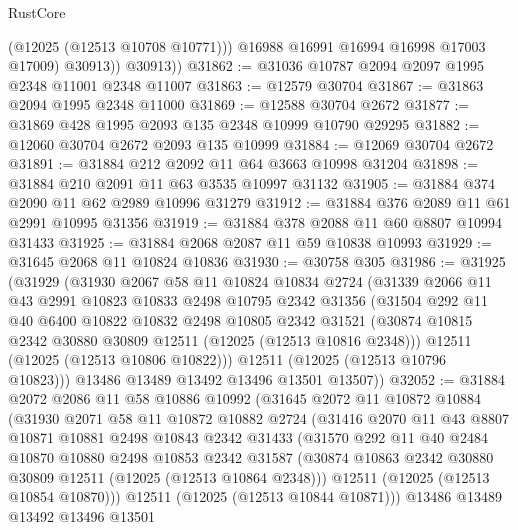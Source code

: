 \begin{lexlean}{RustCore}
\begin{coremodule}
                (@12025 (@12513 @10708 @10771)))
              @16988
              @16991
              @16994
              @16998
              @17003
              @17009)
            @30913))
        @30913))
@31862 := @31036 @10787 @2094 @2097 @1995 @2348 @11001 @2348 @11007
@31863 := @12579 @30704
@31867 := @31863 @2094 @1995 @2348 @11000
@31869 := @12588 @30704 @2672
@31877 := @31869 @428 @1995 @2093 @135 @2348 @10999 @10790 @29295
@31882 := @12060 @30704 @2672 @2093 @135 @10999
@31884 := @12069 @30704 @2672
@31891 := @31884 @212 @2092 @11 @64 @3663 @10998 @31204
@31898 := @31884 @210 @2091 @11 @63 @3535 @10997 @31132
@31905 := @31884 @374 @2090 @11 @62 @2989 @10996 @31279
@31912 := @31884 @376 @2089 @11 @61 @2991 @10995 @31356
@31919 := @31884 @378 @2088 @11 @60 @8807 @10994 @31433
@31925 := @31884 @2068 @2087 @11 @59 @10838 @10993
@31929 := @31645 @2068 @11 @10824 @10836
@31930 := @30758 @305
@31986 := @31925
    (@31929
      (@31930
        @2067
        @58
        @11
        @10824
        @10834
        @2724
        (@31339
          @2066
          @11
          @43
          @2991
          @10823
          @10833
          @2498
          @10795
          @2342
          @31356
          (@31504
            @292
            @11
            @40
            @6400
            @10822
            @10832
            @2498
            @10805
            @2342
            @31521
            (@30874 @10815 @2342 @30880 @30809 @12511 (@12025 (@12513 @10816 @2348)))
            @12511
            (@12025 (@12513 @10806 @10822)))
          @12511
          (@12025 (@12513 @10796 @10823)))
        @13486
        @13489
        @13492
        @13496
        @13501
        @13507))
@32052 := @31884
    @2072
    @2086
    @11
    @58
    @10886
    @10992
    (@31645
      @2072
      @11
      @10872
      @10884
      (@31930
        @2071
        @58
        @11
        @10872
        @10882
        @2724
        (@31416
          @2070
          @11
          @43
          @8807
          @10871
          @10881
          @2498
          @10843
          @2342
          @31433
          (@31570
            @292
            @11
            @40
            @2484
            @10870
            @10880
            @2498
            @10853
            @2342
            @31587
            (@30874 @10863 @2342 @30880 @30809 @12511 (@12025 (@12513 @10864 @2348)))
            @12511
            (@12025 (@12513 @10854 @10870)))
          @12511
          (@12025 (@12513 @10844 @10871)))
        @13486
        @13489
        @13492
        @13496
        @13501

\end{coremodule}
\end{lexlean}
